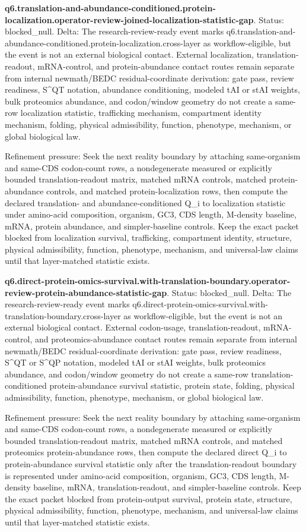 \textbf{q6.translation-and-abundance-conditioned.protein-localization.operator-review-joined-localization-statistic-gap}. Status: blocked\_null. Delta: The research-review-ready event marks q6.translation-and-abundance-conditioned.protein-localization.cross-layer as workflow-eligible, but the event is not an external biological contact. External localization, translation-readout, mRNA-control, and protein-abundance contact routes remain separate from internal newmath/BEDC residual-coordinate derivation: gate pass, review readiness, S\textasciicircum{}QT notation, abundance conditioning, modeled tAI or stAI weights, bulk proteomics abundance, and codon/window geometry do not create a same-row localization statistic, trafficking mechanism, compartment identity mechanism, folding, physical admissibility, function, phenotype, mechanism, or global biological law.

Refinement pressure: Seek the next reality boundary by attaching same-organism and same-CDS codon-count rows, a nondegenerate measured or explicitly bounded translation-readout matrix, matched mRNA controls, matched protein-abundance controls, and matched protein-localization rows, then compute the declared translation- and abundance-conditioned Q\_i to localization statistic under amino-acid composition, organism, GC3, CDS length, M-density baseline, mRNA, protein abundance, and simpler-baseline controls. Keep the exact packet blocked from localization survival, trafficking, compartment identity, structure, physical admissibility, function, phenotype, mechanism, and universal-law claims until that layer-matched statistic exists.

\textbf{q6.direct-protein-omics-survival.with-translation-boundary.operator-review-protein-abundance-statistic-gap}. Status: blocked\_null. Delta: The research-review-ready event marks q6.direct-protein-omics-survival.with-translation-boundary.cross-layer as workflow-eligible, but the event is not an external biological contact. External codon-usage, translation-readout, mRNA-control, and proteomics-abundance contact routes remain separate from internal newmath/BEDC residual-coordinate derivation: gate pass, review readiness, S\textasciicircum{}QT or S\textasciicircum{}QP notation, modeled tAI or stAI weights, bulk proteomics abundance, and codon/window geometry do not create a same-row translation-conditioned protein-abundance survival statistic, protein state, folding, physical admissibility, function, phenotype, mechanism, or global biological law.

Refinement pressure: Seek the next reality boundary by attaching same-organism and same-CDS codon-count rows, a nondegenerate measured or explicitly bounded translation-readout matrix, matched mRNA controls, and matched proteomics protein-abundance rows, then compute the declared direct Q\_i to protein-abundance survival statistic only after the translation-readout boundary is represented under amino-acid composition, organism, GC3, CDS length, M-density baseline, mRNA, translation-readout, and simpler-baseline controls. Keep the exact packet blocked from protein-output survival, protein state, structure, physical admissibility, function, phenotype, mechanism, and universal-law claims until that layer-matched statistic exists.

